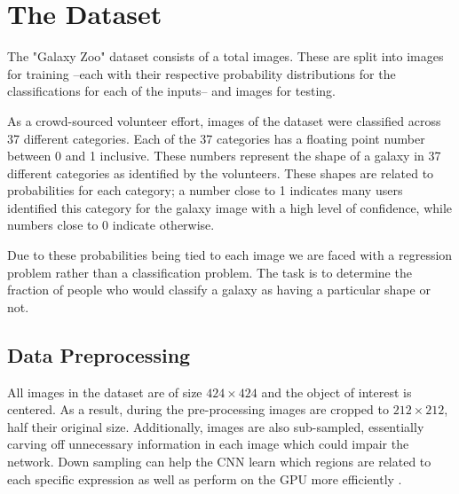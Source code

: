 \section{The Dataset}

The "Galaxy Zoo" dataset consists of a total  images. These are split into  images for training --each with their respective probability distributions for the classifications for each of the inputs-- and  images for testing.

As a crowd-sourced volunteer effort, images of the dataset were classified across 37 different categories. Each of the 37 categories has a floating point number between 0 and 1 inclusive. These numbers represent the shape of a galaxy in 37 different categories as identified by the volunteers. These shapes are related to probabilities for each category; a number close to 1 indicates many users identified this category for the galaxy image with a high level of confidence, while numbers close to 0 indicate otherwise.

Due to these probabilities being tied to each image we are faced with a regression problem rather than a classification problem. The task is to determine the fraction of people who would classify a galaxy as having a particular shape or not.

\subsection{Data Preprocessing}

All images in the dataset are of size $424\times424$ and the object of interest is centered. As a result, during the pre-processing images are cropped to $212\times212$, half their original size. Additionally, images are also sub-sampled, essentially carving off unnecessary information in each image which could impair the network. Down sampling can help the CNN learn which regions are related to each specific expression as well as perform on the GPU more efficiently \cite{deep-learning-review}.
